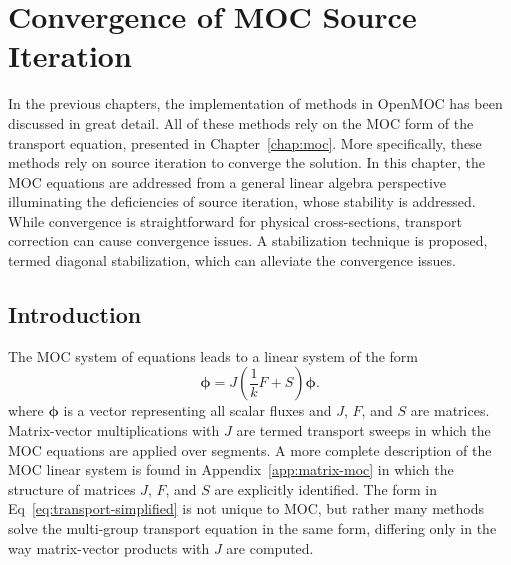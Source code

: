 \chapter{Convergence of MOC Source Iteration}
\label{chap:moc-convergence}

In the previous chapters, the implementation of methods in OpenMOC has been discussed in great detail. All of these methods rely on the \ac{MOC} form of the transport equation, presented in Chapter~\ref{chap:moc}. More specifically, these methods rely on source iteration to converge the solution. In this chapter, the \ac{MOC} equations are addressed from a general linear algebra perspective illuminating the deficiencies of source iteration, whose stability is addressed. While convergence is straightforward for physical cross-sections, transport correction can cause convergence issues. A stabilization technique is proposed, termed diagonal stabilization, which can alleviate the convergence issues.

\section{Introduction}
\label{sec:si-intro}

The \ac{MOC} system of equations leads to a linear system of the form
\begin{equation}
	\boldsymbol{\phi} = J \left(\frac{1}{k} F + S \right) \boldsymbol{\phi}.
	\label{eq:transport-simplified}
\end{equation}
where $\boldsymbol{\phi}$ is a vector representing all scalar fluxes and $J$, $F$, and $S$ are matrices. Matrix-vector multiplications with $J$ are termed transport sweeps in which the \ac{MOC} equations are applied over segments. A more complete description of the \ac{MOC} linear system is found in Appendix~\ref{app:matrix-moc} in which the structure of matrices $J$, $F$, and $S$ are explicitly identified. The form in Eq~\ref{eq:transport-simplified} is not unique to \ac{MOC}, but rather many methods solve the multi-group transport equation in the same form, differing only in the way matrix-vector products with $J$ are computed.

